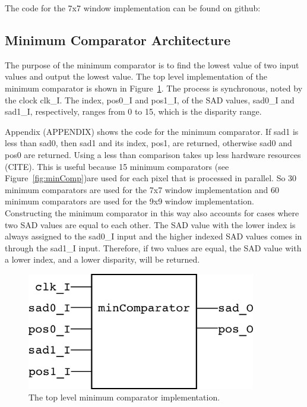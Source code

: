 The code for the 7x7 window implementation can be found on github:
\\

\subsection{Minimum Comparator Architecture}

The purpose of the minimum comparator is to find the lowest value of two input values and output the lowest value. The top level implementation of the minimum comparator is shown in Figure~\ref{fig:minComp_rtl}. The process is synchronous, noted by the clock clk\_I. The index, pos0\_I and pos1\_I, of the SAD values, sad0\_I and sad1\_I, respectively, ranges from 0 to 15, which is the disparity range. 

Appendix (APPENDIX) shows the code for the minimum comparator. If sad1 is less than sad0, then sad1 and its index, pos1, are returned, otherwise sad0 and pos0 are returned. Using a less than comparison takes up less hardware resources (CITE). This is useful because 15 minimum comparators (see Figure~\ref{fig:minComp})are used for each pixel that is processed in parallel. So 30 minimum comparators are used for the 7x7 window implementation and 60 minimum comparators are used for the 9x9 window implementation. Constructing the minimum comparator in this way also accounts for cases where two SAD values are equal to each other. The SAD value with the lower index is always assigned to the sad0\_I input and the higher indexed SAD values comes in through the sad1\_I input. Therefore, if two values are equal, the SAD value with a lower index, and a lower disparity, will be returned.

\begin{figure}[h]
	\begin{center}
		\includegraphics[width=100mm]{figures/minComparator_rtl.png}
		\captionfonts
		\caption{The top level minimum comparator implementation.}
		\label{fig:minComp_rtl}
	\end{center}
\end{figure}

